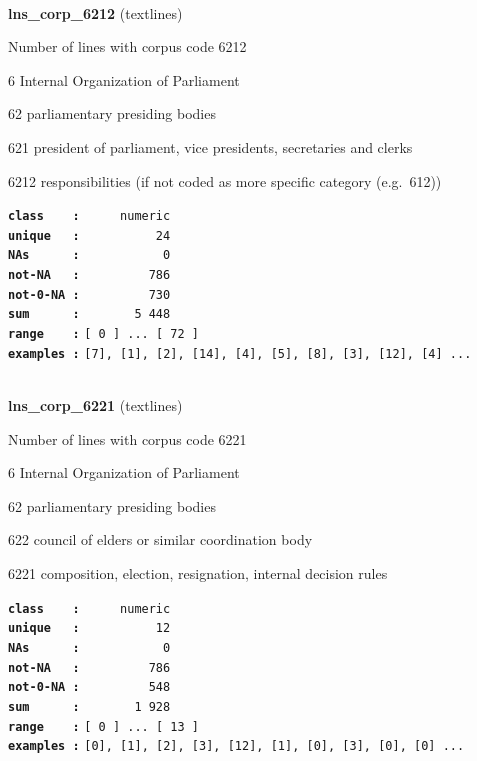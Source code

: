 \documentclass[]{article}
\begin{document}
~

\textbf{lns\_corp\_6212} (textlines)

Number of lines with corpus code 6212

6 Internal Organization of Parliament

62 parliamentary presiding bodies

621 president of parliament, vice presidents, secretaries and clerks

6212 responsibilities (if not coded as more specific category
(e.g.~612))

\textbf{\texttt{class\ \ \ \ :}} \texttt{~~~~~numeric}\\
\textbf{\texttt{unique\ \ \ :}} \texttt{~~~~~~~~~~24}\\
\textbf{\texttt{NAs\ \ \ \ \ \ :}} \texttt{~~~~~~~~~~~0}\\
\textbf{\texttt{not-NA\ \ \ :}} \texttt{~~~~~~~~~786}\\
\textbf{\texttt{not-0-NA\ :}} \texttt{~~~~~~~~~730}\\
\textbf{\texttt{sum\ \ \ \ \ \ :}} \texttt{~~~~~~~5~448}\\
\textbf{\texttt{range\ \ \ \ :}}
\texttt{{[}\ 0\ {]}\ ...\ {[}\ 72\ {]}}\\
\textbf{\texttt{examples\ :}}
\texttt{{[}7{]},\ {[}1{]},\ {[}2{]},\ {[}14{]},\ {[}4{]},\ {[}5{]},\ {[}8{]},\ {[}3{]},\ {[}12{]},\ {[}4{]}\ ...}\\

~

\textbf{lns\_corp\_6221} (textlines)

Number of lines with corpus code 6221

6 Internal Organization of Parliament

62 parliamentary presiding bodies

622 council of elders or similar coordination body

6221 composition, election, resignation, internal decision rules

\textbf{\texttt{class\ \ \ \ :}} \texttt{~~~~~numeric}\\
\textbf{\texttt{unique\ \ \ :}} \texttt{~~~~~~~~~~12}\\
\textbf{\texttt{NAs\ \ \ \ \ \ :}} \texttt{~~~~~~~~~~~0}\\
\textbf{\texttt{not-NA\ \ \ :}} \texttt{~~~~~~~~~786}\\
\textbf{\texttt{not-0-NA\ :}} \texttt{~~~~~~~~~548}\\
\textbf{\texttt{sum\ \ \ \ \ \ :}} \texttt{~~~~~~~1~928}\\
\textbf{\texttt{range\ \ \ \ :}}
\texttt{{[}\ 0\ {]}\ ...\ {[}\ 13\ {]}}\\
\textbf{\texttt{examples\ :}}
\texttt{{[}0{]},\ {[}1{]},\ {[}2{]},\ {[}3{]},\ {[}12{]},\ {[}1{]},\ {[}0{]},\ {[}3{]},\ {[}0{]},\ {[}0{]}\ ...}\\
\end{document}
